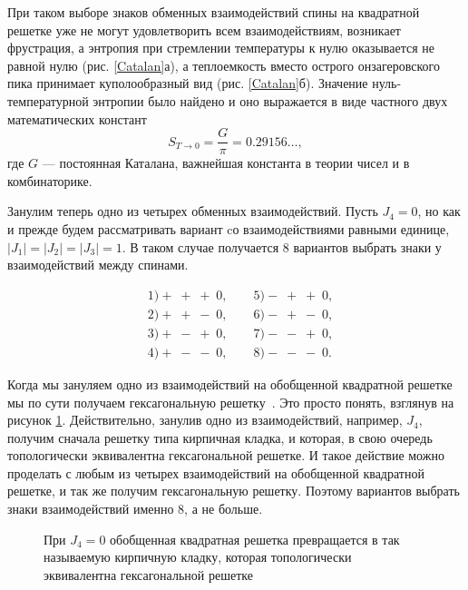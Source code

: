 \documentclass[utf8,12pt]{jetp}
\begin{document}
При таком выборе знаков обменных взаимодействий спины на квадратной решетке уже не могут удовлетворить всем взаимодействиям, возникает фрустрация, а энтропия при стремлении температуры к нулю оказывается не равной нулю (рис. \ref{Catalan}а), а теплоемкость вместо острого онзагеровского пика принимает куполообразный вид (рис. \ref{Catalan}б). Значение нуль-температурной энтропии было найдено и оно выражается в виде частного двух математических констант
\begin{equation}
S_{T\rightarrow 0} = \frac{G}{\pi} = 0.29156\dots,
\label{g}
\end{equation} 
где $G$ --- постоянная Каталана, важнейшая константа в теории чисел и в комбинаторике.

Занулим теперь одно из четырех обменных взаимодействий. Пусть $J_4 = 0$, но как и прежде будем рассматривать вариант cо взаимодействиями равными единице, $|J_1| = |J_2| = |J_3| = 1$. В таком случае получается 8 вариантов выбрать знаки у взаимодействий между спинами.

\begin{align*}
	&1) +\;+\;+\;0, \qquad   5) -\;+\;+\;0, \\
	&2) +\;+\;-\;0, \qquad  6) -\;+\;-\;0, \\
	&3) +\;-\;+\;0, \qquad  7) -\;-\;+\;0, \\
	&4) +\;-\;-\;0, \qquad  8) -\;-\;-\;0.
\end{align*}

Когда мы зануляем одно из взаимодействий на обобщенной квадратной решетке мы по сути получаем гексагональную решетку~\cite{generalizedIsing2021}. Это просто понять, взглянув на рисунок \ref{hexTranf}. Действительно, занулив одно из взаимодействий, например, $J_4$, получим сначала решетку типа кирпичная кладка, и которая, в свою очередь топологически эквивалентна гексагональной решетке. И такое действие можно проделать с любым из четырех взаимодействий на обобщенной квадратной решетке, и так же получим гексагональную решетку. Поэтому вариантов выбрать знаки взаимодействий именно 8, а не больше. 

\begin{figure}[h]
	\caption{При $J_4 = 0$ обобщенная квадратная решетка превращается в так называемую кирпичную кладку, которая топологически эквивалентна гексагональной решетке}
	\label{hexTranf}
\end{figure}
\end{document}
